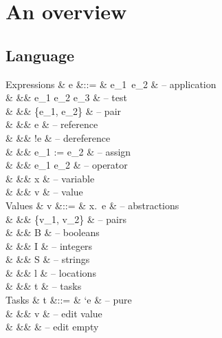 
\newpage
\section{An overview}

\statefultrue


\subsection{Language}

\begin{grammar}
  Expressions
    & e      &::= & e_1\ e_2                    & – application \\
    &        &\mid& \If e_1 \Then e_2 \Else e_3 & – test \\
    &        &\mid& \{e_1, e_2\}                & – pair \\
    &        &\mid& \Ref e                      & – reference \\
    &        &\mid& !e                          & – dereference \\
    &        &\mid& e_1 := e_2                  & – assign \\
    &        &\mid& e_1 \star e_2               & – operator \\
    &        &\mid& x                           & – variable \\
    &        &\mid& v                           & – value \\
  Values
    & v      &::= & \lambda x.\ e               & – abstractions \\
    &        &\mid& \{v_1, v_2\}                & – pairs \\
    &        &\mid& B \in \BB                   & – booleans \\
    &        &\mid& I \in \ZZ                   & – integers \\
    &        &\mid& S \in \SS                   & – strings \\
    &        &\mid& l                           & – locations \\
    &        &\mid& t                           & – tasks \\
  Tasks
    & t      &::= & `e                          & – pure \\
    &        &\mid& \Edit v                     & – edit value \\
    &        &\mid& \Empty \tau                 & – edit empty \\

\end{grammar}
